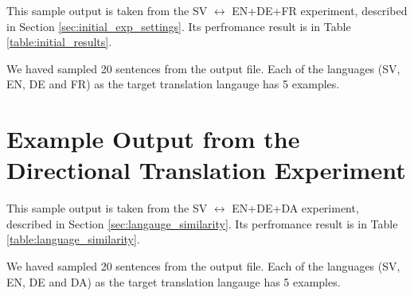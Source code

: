 \documentclass[thesis,fonts=libertine]{cluu}
\begin{document}
This sample output is taken from the SV $\leftrightarrow$ EN+DE+FR experiment, described in Section \ref{sec:initial_exp_settings}. Its perfromance result is in Table \ref{table:initial_results}.

We haved sampled 20 sentences from the output file. Each of the languages (SV, EN, DE and FR) as the target translation langauge has 5 examples.



\section{Example Output from the Directional Translation Experiment}
\label{sec:directional_output}

This sample output is taken from the SV $\leftrightarrow$ EN+DE+DA experiment, described in Section \ref{sec:langauge_similarity}. Its perfromance result is in Table \ref{table:language_similarity}.

We haved sampled 20 sentences from the output file. Each of the languages (SV, EN, DE and DA) as the target translation langauge has 5 examples.



\printbibliography
\end{document}
